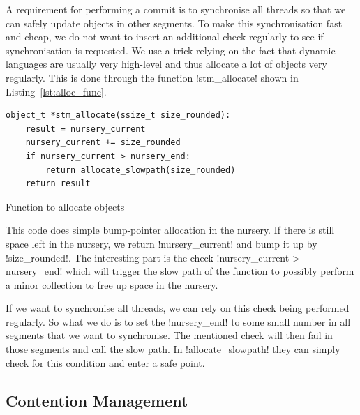 \documentclass{sigplanconf}
\makeatletter
\renewcommand\lstinline[1][]{%
  \Collectverb{\@@myverb}%
}
\def\@@myverb#1{%
    \begingroup
    \fboxsep=0.2em
    \colorbox{verylightgray}{\oldlstinline|#1|}%
    \endgroup
}
\makeatother
\begin{document}
A requirement for performing a commit is to synchronise all threads so
that we can safely update objects in other segments. To make this
synchronisation fast and cheap, we do not want to insert an additional
check regularly to see if synchronisation is requested. We
use a trick relying on the fact that dynamic languages are usually
very high-level and thus allocate a lot of objects very regularly.
This is done through the function \lstinline!stm_allocate!  shown
in Listing~\ref{lst:alloc_func}.

\begin{code}[h]
\begin{lstlisting}
object_t *stm_allocate(ssize_t size_rounded):
    result = nursery_current
	nursery_current += size_rounded
	if nursery_current > nursery_end:
		return allocate_slowpath(size_rounded)
	return result
\end{lstlisting}
\caption{Function to allocate objects\label{lst:alloc_func}}
\end{code}

This code does simple bump-pointer allocation in the nursery. If there
is still space left in the nursery, we return
\lstinline!nursery_current!  and bump it up by
\lstinline!size_rounded!.  The interesting part is the check
\lstinline!nursery_current > nursery_end!  which will trigger the slow
path of the function to possibly perform a minor collection
to free up space in the nursery.

If we want to synchronise all threads, we can rely on this check being
performed regularly. So what we do is to set the
\lstinline!nursery_end!  to some small number in all segments that we
want to synchronise. The mentioned check will then fail in those
segments and call the slow path. In \lstinline!allocate_slowpath!
they can simply check for this condition and enter a safe point.



\subsection{Contention Management\label{subsub:contentionmanagement}}
\end{document}
